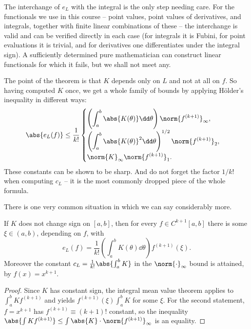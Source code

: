 \begin{remark}
  The interchange of $e_L$ with the integral is the only step needing care. For the functionals we use in this course -- point values, point values of derivatives, and integrals, together with finite linear combinations of these -- the interchange is valid and can be verified directly in each case (for integrals it is Fubini, for point evaluations it is trivial, and for derivatives one differentiates under the integral sign). A sufficiently determined pure mathematician can construct linear functionals for which it fails, but we shall not meet any.
\end{remark}

The point of the theorem is that $K$ depends only on $L$ and not at all on $f$. So having computed $K$ once, we get a whole family of bounds by applying Hölder's inequality in different ways:
$$
\abs{e_L(f)} \leq \frac{1}{k!}\begin{cases}
\displaystyle \left(\int_a^b\abs{K(\theta)}\dd\theta\right)\norm{f^{(k+1)}}_\infty,\\[2ex]
\displaystyle \left(\int_a^b \abs{K(\theta)}^2\dd\theta\right)^{1/2}\norm{f^{(k+1)}}_2,\\[2ex]
\displaystyle \norm{K}_\infty \norm{f^{(k+1)}}_1 .
\end{cases}
$$
These constants can be shown to be sharp. And do not forget the factor $1/k!$ when computing $c_L$ -- it is the most commonly dropped piece of the whole formula.

There is one very common situation in which we can say considerably more.

\begin{proposition}\label{prop:signdef}
  If $K$ does not change sign on $[a,b]$, then for every $f \in C^{k+1}[a,b]$ there is some $\xi \in (a,b)$, depending on $f$, with
  $$
  e_L(f) = \frac{1}{k!}\left(\int_a^b K(\theta)\dd\theta\right)f^{(k+1)}(\xi).
  $$
  Moreover the constant $c_L = \frac{1}{k!}\abs{\int_a^b K}$ in the $\norm{\cdot}_\infty$ bound is attained, by $f(x) = x^{k+1}$.
\end{proposition}
\begin{proof}
  Since $K$ has constant sign, the integral mean value theorem applies to $\int_a^b K f^{(k+1)}$ and yields $f^{(k+1)}(\xi)\int_a^b K$ for some $\xi$. For the second statement, $f = x^{k+1}$ has $f^{(k+1)} \equiv (k+1)!$ constant, so the inequality $\abs{\int K f^{(k+1)}}\le \int\abs{K}\cdot\norm{f^{(k+1)}}_\infty$ is an equality.
\end{proof}

